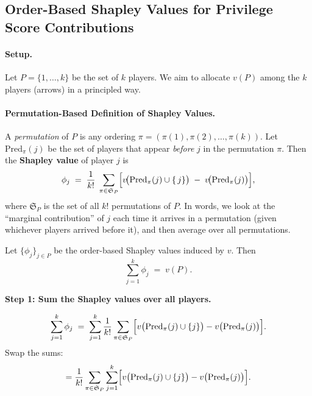 {\begin{enumerate}



\section*{Order-Based Shapley Values for Privilege Score Contributions}

\paragraph{Setup.}
Let $P = \{1,\dots,k\}$ be the set of $k$ players.  
We aim to allocate $v(P)$ among the $k$ players (arrows) in a principled way.

\medskip

\paragraph{Permutation-Based Definition of Shapley Values.}
A \emph{permutation} of $P$ is any ordering $\pi = (\pi(1), \pi(2), \dots, \pi(k))$.  
Let $\mathrm{Pred}_\pi(j)$ be the set of players that appear \emph{before} $j$ in the permutation $\pi$.  
Then the \textbf{Shapley value} of player $j$ is
\[
\phi_j 
\;=\;
\frac{1}{k!}\;
\sum_{\pi \in \mathfrak{S}_P}
\Bigl[v\!\bigl(\mathrm{Pred}_\pi(j) \cup \{\,j\}\bigr)
\;-\;
v\!\bigl(\mathrm{Pred}_\pi(j)\bigr)\Bigr],
\]
where $\mathfrak{S}_P$ is the set of all $k!$ permutations of $P$.  
In words, we look at the “marginal contribution” of $j$ each time it arrives in a permutation (given whichever players arrived before it), and then average over all permutations.

\begin{theorem}[Efficiency]
Let $\{\phi_j\}_{j \in P}$ be the order-based Shapley values induced by $v$. Then
\[
\sum_{j=1}^k \phi_j
\;=\;
v(P).
\]
\end{theorem}

\begin{proofsketch}
\noindent
\textbf{Step 1: Sum the Shapley values over all players.}

\[
\sum_{j=1}^k \phi_j 
\;=\;
\sum_{j=1}^k
\frac{1}{k!}
\sum_{\pi \in \mathfrak{S}_P}
\Bigl[v\bigl(\mathrm{Pred}_\pi(j)\cup\{j\}\bigr)
- 
v\bigl(\mathrm{Pred}_\pi(j)\bigr)\Bigr].
\]
Swap the sums:
\[
=
\frac{1}{k!}
\sum_{\pi \in \mathfrak{S}_P}
\sum_{j=1}^k
\Bigl[v\bigl(\mathrm{Pred}_\pi(j)\cup\{j\}\bigr)
- 
v\bigl(\mathrm{Pred}_\pi(j)\bigr)\Bigr].
\]


\end{proofsketch}
\end{enumerate}}
